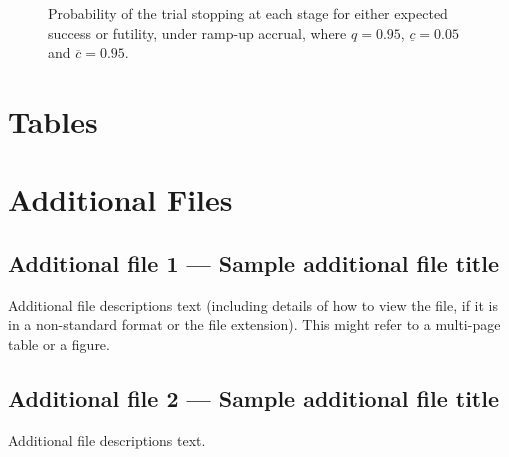 \documentclass{bmcart}
\begin{document}
\begin{backmatter}
\begin{figure}[h!]
	\caption{Probability of the trial stopping at each stage for either expected success or futility, under ramp-up accrual, where \(q=0.95\), \(\underline{c}=0.05\) and \(\overline{c}=0.95\).}\label{fig:stop-ru}
\end{figure}


\section*{Tables}









\section*{Additional Files}
  \subsection*{Additional file 1 --- Sample additional file title}
    Additional file descriptions text (including details of how to
    view the file, if it is in a non-standard format or the file extension).  This might
    refer to a multi-page table or a figure.

  \subsection*{Additional file 2 --- Sample additional file title}
    Additional file descriptions text.

\end{backmatter}
\end{document}
